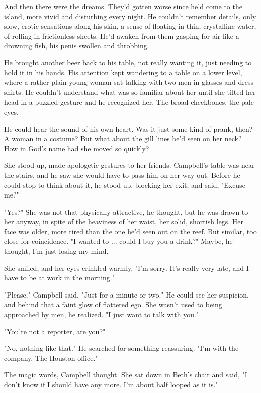 And then there were the dreams. They'd gotten worse since he'd come to the island, more vivid and disturbing every night. He couldn't remember details, only slow, erotic sensations along his skin, a sense of floating in thin, crystalline water, of rolling in frictionless sheets. He'd awaken from them gasping for air like a drowning fish, his penis swollen and throbbing.

He brought another beer back to his table, not really wanting it, just needing to hold it in his hands. His attention kept wandering to a table on a lower level, where a rather plain young woman sat talking with two men in glasses and dress shirts. He couldn't understand what was so familiar about her until she tilted her head in a puzzled gesture and he recognized her. The broad cheekbones, the pale eyes.

He could hear the sound of his own heart. Was it just some kind of prank, then? A woman in a costume? But what about the gill lines he'd seen on her neck? How in God's name had she moved so quickly?

She stood up, made apologetic gestures to her friends. Campbell's table was near the stairs, and he saw she would have to pass him on her way out. Before he could stop to think about it, he stood up, blocking her exit, and said, "Excuse me?"

"Yes?" She was not that physically attractive, he thought, but he was drawn to her anyway, in spite of the heaviness of her waist, her solid, shortish legs. Her face was older, more tired than the one he'd seen out on the reef. But similar, too close for coincidence. "I wanted to ... could I buy you a drink?" Maybe, he thought, I'm just losing my mind.

She smiled, and her eyes crinkled warmly. "I'm sorry. It's really very late, and I have to be at work in the morning."

"Please," Campbell said. "Just for a minute or two." He could see her suspicion, and behind that a faint glow of flattered ego. She wasn't used to being approached by men, he realized. "I just want to talk with you."

"You're not a reporter, are you?"

"No, nothing like that." He searched for something reassuring. "I'm with the company. The Houston office."

The magic words, Campbell thought. She sat down in Beth's chair and said, "I don't know if I should have any more. I'm about half looped as it is."

